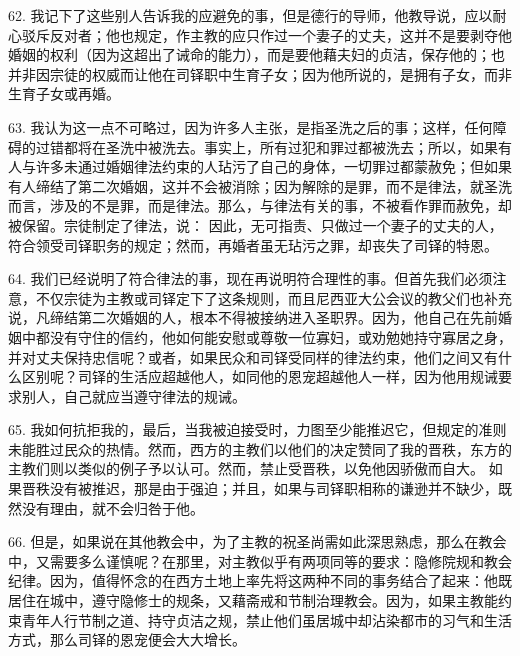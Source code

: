 62. 我记下了这些别人告诉我的应避免的事，但是德行的导师，他教导说，应以耐心驳斥反对者；他也规定，作主教的应只作过一个妻子的丈夫，这并不是要剥夺他婚姻的权利（因为这超出了诫命的能力），而是要他藉夫妇的贞洁，保存他的；也并非因宗徒的权威而让他在司铎职中生育子女；因为他所说的，是拥有子女，而非生育子女或再婚。\par

63. 我认为这一点不可略过，因为许多人主张，是指圣洗之后的事；这样，任何障碍的过错都将在圣洗中被洗去。事实上，所有过犯和罪过都被洗去；所以，如果有人与许多未通过婚姻律法约束的人玷污了自己的身体，一切罪过都蒙赦免；但如果有人缔结了第二次婚姻，这并不会被消除；因为解除的是罪，而不是律法，就圣洗而言，涉及的不是罪，而是律法。那么，与律法有关的事，不被看作罪而赦免，却被保留。宗徒制定了律法，说：  因此，无可指责、只做过一个妻子的丈夫的人，符合领受司铎职务的规定；然而，再婚者虽无玷污之罪，却丧失了司铎的特恩。\par

64. 我们已经说明了符合律法的事，现在再说明符合理性的事。但首先我们必须注意，不仅宗徒为主教或司铎定下了这条规则，而且尼西亚大公会议的教父们也补充说，凡缔结第二次婚姻的人，根本不得被接纳进入圣职界。因为，他自己在先前婚姻中都没有守住的信约，他如何能安慰或尊敬一位寡妇，或劝勉她持守寡居之身，并对丈夫保持忠信呢？或者，如果民众和司铎受同样的律法约束，他们之间又有什么区别呢？司铎的生活应超越他人，如同他的恩宠超越他人一样，因为他用规诫要求别人，自己就应当遵守律法的规诫。\par

65. 我如何抗拒我的，最后，当我被迫接受时，力图至少能推迟它，但规定的准则未能胜过民众的热情。然而，西方的主教们以他们的决定赞同了我的晋秩，东方的主教们则以类似的例子予以认可。然而，禁止受晋秩，以免他因骄傲而自大。 如果晋秩没有被推迟，那是由于强迫；并且，如果与司铎职相称的谦逊并不缺少，既然没有理由，就不会归咎于他。\par

66. 但是，如果说在其他教会中，为了主教的祝圣尚需如此深思熟虑，那么在教会中，又需要多么谨慎呢？在那里，对主教似乎有两项同等的要求：隐修院规和教会纪律。因为，值得怀念的在西方土地上率先将这两种不同的事务结合了起来：他既居住在城中，遵守隐修士的规条，又藉斋戒和节制治理教会。因为，如果主教能约束青年人行节制之道、持守贞洁之规，禁止他们虽居城中却沾染都市的习气和生活方式，那么司铎的恩宠便会大大增长。\par

